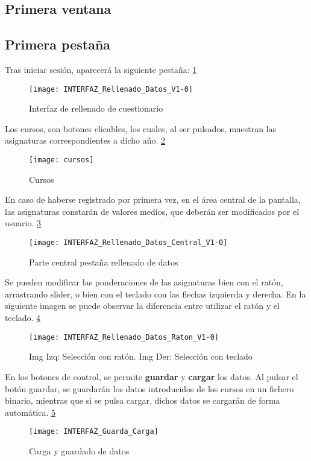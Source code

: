 \subsection{Primera ventana}

\subsection{Primera pestaña}
Tras iniciar sesión, aparecerá la siguiente pestaña: \ref{fig:E.2.1}
\begin{figure}[h]
\centering
\texttt{[image: INTERFAZ\_Rellenado\_Datos\_V1-0]}
\caption{Interfaz de rellenado de cuestionario}
\label{fig:E.2.1}
\end{figure}
Los cursos, son botones clicables, los cuales, al ser pulsados, muestran las asignaturas correspondientes a dicho año. \ref{fig:E.2.2}
\begin{figure}[h]
\centering
\texttt{[image: cursos]}
\caption{Cursos}
\label{fig:E.2.2}
\end{figure}

En caso de haberse registrado por primera vez, en el área central de la pantalla, las asignaturas constarán de valores medios, que deberán ser modificados por el usuario. \ref{fig:E.2.3}
\begin{figure}[h]
\centering
\texttt{[image: INTERFAZ\_Rellenado\_Datos\_Central\_V1-0]}
\caption{Parte central pestaña rellenado de datos}
\label{fig:E.2.3}
\end{figure}
Se pueden modificar las ponderaciones de las asignaturas bien con el ratón, arrastrando  slider, o bien con el teclado con las flechas izquierda y derecha. En la siguiente imagen se puede observar la diferencia entre utilizar el ratón y el teclado. \ref{fig:E.2.4}
\begin{figure}[h]
\centering
\texttt{[image: INTERFAZ\_Rellenado\_Datos\_Raton\_V1-0]}
\caption{Img Izq: Selección con ratón. Img Der: Selección con teclado}
\label{fig:E.2.4}
\end{figure}

En los botones de control, se permite \textbf{guardar} y \textbf{cargar} los datos. Al pulsar el botón guardar, se guardarán los datos introducidos de los cursos en un fichero binario, mientras que si se pulsa cargar, dichos datos se cargarán de forma automática. \ref{fig:E.2.5}
\begin{figure}[h]
\centering
\texttt{[image: INTERFAZ\_Guarda\_Carga]}
\caption{Carga y guardado de datos}
\label{fig:E.2.5}
\end{figure}

